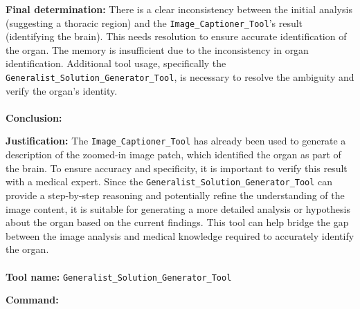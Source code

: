 \begin{plannerbox}
\textbf{Final determination:}
There is a clear inconsistency between the initial analysis (suggesting a thoracic region) and the \texttt{Image\_Captioner\_Tool}'s result (identifying the brain). This needs resolution to ensure accurate identification of the organ.
The memory is insufficient due to the inconsistency in organ identification. Additional tool usage, specifically the \texttt{Generalist\_Solution\_Generator\_Tool}, is necessary to resolve the ambiguity and verify the organ's identity.
\\\\
\textbf{Conclusion:} 
\end{plannerbox}

\begin{plannerbox}

\textbf{Justification:}
The \texttt{Image\_Captioner\_Tool} has already been used to generate a description of the zoomed-in image patch, which identified the organ as part of the brain. To ensure accuracy and specificity, it is important to verify this result with a medical expert. Since the \texttt{Generalist\_Solution\_Generator\_Tool} can provide a step-by-step reasoning and potentially refine the understanding of the image content, it is suitable for generating a more detailed analysis or hypothesis about the organ based on the current findings. This tool can help bridge the gap between the image analysis and medical knowledge required to accurately identify the organ.
\\\\
\textbf{Tool name:} \texttt{Generalist\_Solution\_Generator\_Tool}
\end{plannerbox}


\begin{executorbox}
\textbf{Command:}
\end{executorbox}


